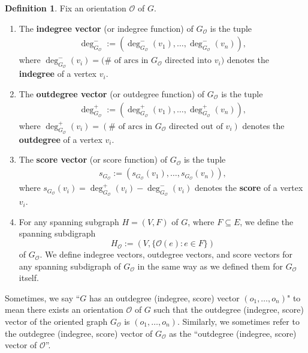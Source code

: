 \documentclass[12pt]{article}
\theoremstyle{definition}
\newtheorem{definition}[theorem]{Definition}
\theoremstyle{remark}
\newcommand{\Or}{\mathcal{O}}
\begin{document}
\begin{definition} Fix an orientation $\mathcal{O}$ of $G$.
    \begin{enumerate}
        \item The \textbf{indegree vector} (or indegree function) of $G_{\mathcal{O}}$ is the tuple \begin{align*}
            \deg_{G_{\mathcal{O}}}^- := (\deg_{G_{\mathcal{O}}}^-(v_1),\ldots,\deg_{G_\mathcal{O}}^-(v_n)),
        \end{align*} where $\deg_{G_\mathcal{O}}^-(v_i) = (\# \text{ of arcs in $G_\mathcal{O}$ directed into $v_i$)}$ denotes the \textbf{indegree} of a vertex $v_i$.
        \item The \textbf{outdegree vector} (or outdegree function) of $G_\mathcal{O}$ is the tuple \begin{align*}
            \deg_{G_\mathcal{O}}^+ := (\deg_{G_\mathcal{O}}^+(v_1),\ldots,\deg_{G_\mathcal{O}}^+(v_n)),
        \end{align*} where $\deg_{G_\mathcal{O}}^+(v_i) = (\# \text{ of arcs in $G_\mathcal{O}$ directed out of $v_i$})$ denotes the \textbf{outdegree} of a vertex $v_i$.
        \item The \textbf{score vector} (or score function) of $G_\mathcal{O}$ is the tuple \begin{align*}
            s_{G_\mathcal{O}} := (s_{G_{\mathcal{O}}}(v_1),\ldots,s_{G_{\mathcal{O}}}(v_n)),
        \end{align*} where $s_{G_{\mathcal{O}}}(v_i) = \deg_{G_{\mathcal{O}}}^+(v_i) - \deg_{G_{\mathcal{O}}}^-(v_i)$ denotes the \textbf{score} of a vertex $v_i$. 
        \item For any spanning subgraph $H=(V,F)$ of $G$, where $F \subseteq E$, we define the spanning subdigraph
		\[
		H_{\mathcal{O}} := (V,\{\mathcal{O}(e) : e \in F\})
		\]
		of $G_{\Or}$. We define indegree vectors, outdegree vectors, and score vectors for any spanning subdigraph of $G_{\Or}$ in the same way as we defined them for $G_{\Or}$ itself.
		
    \end{enumerate}
\end{definition} Sometimes, we say ``$G$ has an outdegree (indegree, score) vector $(o_1,\ldots,o_n)$" to mean there exists an orientation $\mathcal{O}$ of $G$ such that the outdegree (indegree, score) vector of the oriented graph $G_{\mathcal{O}}$ is $(o_1,\ldots,o_n)$.
Similarly, we sometimes refer to the outdegree (indegree, score) vector of $G_{\mathcal{O}}$ as the ``outdegree (indegree, score) vector of $\mathcal{O}$''.
\end{document}
